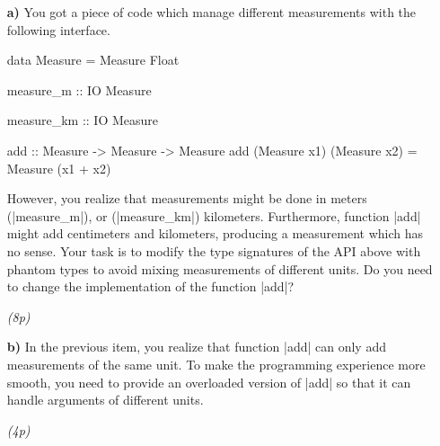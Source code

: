 \documentclass[a4,11pt]{article}
\newif\ifsol
\newcommand{\points}[1]{\hfill \textsl{({#1}p)}}
\begin{document}
\begin{enumerate}

\item[\textbf{a)}] %
  You got a piece of code which manage different measurements with the following
  interface.
%
\begin{code}
data Measure = Measure Float

measure_m   ::  IO  Measure

measure_km  ::  IO  Measure

add :: Measure -> Measure -> Measure
add (Measure x1) (Measure x2) = Measure (x1 + x2)

\end{code}
%
However, you realize that measurements might be done in meters (|measure_m|), or
(|measure_km|) kilometers.
%
Furthermore, function |add| might add centimeters and kilometers, producing a
measurement which has no sense.
%
Your task is to modify the type signatures of the API above with phantom types
to avoid mixing measurements of different units.
%
Do you need to change the implementation of the function |add|?

\ifsol
\begin{code}
data Kilometer
data Meter

data Measure u = Measure Float

measure_m   ::  IO  (Measure Meter)

measure_km  ::  IO  (Measure Kilometer)

add :: Measure u -> Measure u -> Measure u
add (Measure x1) (Measure x2) = Measure (x1 + x2)
\end{code}
\fi

\points{8}

\item[\textbf{b)}] %
In the previous item, you realize that function |add| can only add measurements
of the same unit.
%
To make the programming experience more smooth, you need to provide an
overloaded version of |add| so that it can handle arguments of different units.
%
\ifsol
\begin{code}
class Comb a b c where
  add' :: a -> b -> c

instance Comb (Measure Meter) (Measure Kilometer) (Measure  Meter) where
  add' (Measure m) (Measure km) = Measure (m + 1000*km)

instance Comb (Measure Meter) (Measure Kilometer) (Measure Kilometer) where
  add' (Measure m) (Measure km) = Measure (km + m*0.001))

-- More instances that are trivially defined
\end{code}
\fi
\points{4}


\end{enumerate}
\end{document}
